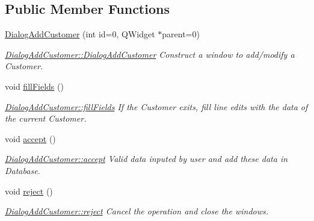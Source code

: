 \subsection*{Public Member Functions}
\begin{DoxyCompactItemize}
\item 
\hyperlink{classGui_1_1Dialogs_1_1DialogAddCustomer_a7ac689e5bcf3c4e28426016b5a2f1478}{Dialog\+Add\+Customer} (int id=0, Q\+Widget $\ast$parent=0)
\begin{DoxyCompactList}\small\item\em \hyperlink{classGui_1_1Dialogs_1_1DialogAddCustomer_a7ac689e5bcf3c4e28426016b5a2f1478}{Dialog\+Add\+Customer\+::\+Dialog\+Add\+Customer} Construct a window to add/modify a Customer. \end{DoxyCompactList}\item 
\hypertarget{classGui_1_1Dialogs_1_1DialogAddCustomer_a25d53880ea053c960ee621fec29afb36}{}void \hyperlink{classGui_1_1Dialogs_1_1DialogAddCustomer_a25d53880ea053c960ee621fec29afb36}{fill\+Fields} ()\label{classGui_1_1Dialogs_1_1DialogAddCustomer_a25d53880ea053c960ee621fec29afb36}

\begin{DoxyCompactList}\small\item\em \hyperlink{classGui_1_1Dialogs_1_1DialogAddCustomer_a25d53880ea053c960ee621fec29afb36}{Dialog\+Add\+Customer\+::fill\+Fields} If the Customer exits, fill line edits with the data of the current Customer. \end{DoxyCompactList}\item 
\hypertarget{classGui_1_1Dialogs_1_1DialogAddCustomer_ab9f488af3fdfbf0ca9851cc59946dd5d}{}void \hyperlink{classGui_1_1Dialogs_1_1DialogAddCustomer_ab9f488af3fdfbf0ca9851cc59946dd5d}{accept} ()\label{classGui_1_1Dialogs_1_1DialogAddCustomer_ab9f488af3fdfbf0ca9851cc59946dd5d}

\begin{DoxyCompactList}\small\item\em \hyperlink{classGui_1_1Dialogs_1_1DialogAddCustomer_ab9f488af3fdfbf0ca9851cc59946dd5d}{Dialog\+Add\+Customer\+::accept} Valid data inputed by user and add these data in Database. \end{DoxyCompactList}\item 
\hypertarget{classGui_1_1Dialogs_1_1DialogAddCustomer_a5f3b96e858dedc8a54ff184baafd6e90}{}void \hyperlink{classGui_1_1Dialogs_1_1DialogAddCustomer_a5f3b96e858dedc8a54ff184baafd6e90}{reject} ()\label{classGui_1_1Dialogs_1_1DialogAddCustomer_a5f3b96e858dedc8a54ff184baafd6e90}

\begin{DoxyCompactList}\small\item\em \hyperlink{classGui_1_1Dialogs_1_1DialogAddCustomer_a5f3b96e858dedc8a54ff184baafd6e90}{Dialog\+Add\+Customer\+::reject} Cancel the operation and close the windows. \end{DoxyCompactList}\end{DoxyCompactItemize}


